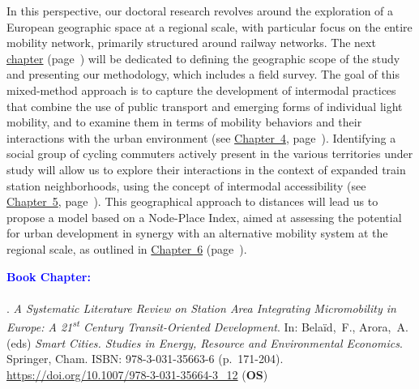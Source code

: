 \begin{refsegment}
In this perspective, our doctoral research revolves around the exploration of a European geographic space at a regional scale, with particular focus on the entire mobility network, primarily structured around railway networks. The next \hyperref[chap3:titre]{chapter} (page~\pageref{chap3:titre}) will be dedicated to defining the geographic scope of the study and presenting our methodology, which includes a field survey. The goal of this mixed-method approach is to capture the development of intermodal practices that combine the use of public transport and emerging forms of individual light mobility, and to examine them in terms of mobility behaviors and their interactions with the urban environment (see \hyperref[chap4:titre]{Chapter~4}, page~\pageref{chap4:titre}). Identifying a social group of cycling commuters actively present in the various territories under study will allow us to explore their interactions in the context of expanded train station neighborhoods, using the concept of intermodal accessibility (see \hyperref[chap5:titre]{Chapter~5}, page~\pageref{chap5:titre}). This geographical approach to distances will lead us to propose a model based on a Node-Place Index, aimed at assessing the potential for urban development in synergy with an alternative mobility system at the regional scale, as outlined in \hyperref[chap6:titre]{Chapter~6} (page~\pageref{chap6:titre}).%

     \newpage
     
    \begin{tcolorbox}[colback=white!5!white,
                      colframe=blue!75!blue,
                      title=Valorization
                      \\
                      Chapitre~2]
\Large{\textbf{\textcolor{blue}{Book Chapter:}}}
    \\\\
\small{\textcolor{blue}{\textcite{moinse_systematic_2023}}. \foreignlanguage{english}{\textsl{A Systematic Literature Review on Station Area Integrating Micromobility in Europe: A 21\textsuperscript{st} Century Transit-Oriented Development}}. In: Belaïd,~F., Arora,~A. (eds) \textsl{Smart Cities. Studies in Energy, Resource and Environmental Economics}. Springer, Cham. ISBN: 978-3-031-35663-6 (p.~171-204).
\\
\footnotesize{\url{https://doi.org/10.1007/978-3-031-35664-3_12}} (\textbf{OS})}
    \end{tcolorbox}

    \newpage
    \begingroup
    \renewcommand{\bibfont}{\scriptsize}
\printbibliography[segment=\therefsegment, heading=subbibintoc, title={Bibliography of Chapter~2}, label=chap2:bibliographie]
    \endgroup
    \end{refsegment}